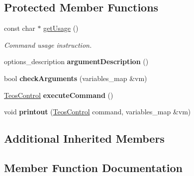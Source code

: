 \subsection*{Protected Member Functions}
\begin{DoxyCompactItemize}
\item 
const char $\ast$ \mbox{\hyperlink{classteos_1_1control_1_1_daemon_start_options_ae036aeede350023308b66b063ba00bd8}{get\+Usage}} ()
\begin{DoxyCompactList}\small\item\em Command \textquotesingle{}usage\textquotesingle{} instruction. \end{DoxyCompactList}\item 
\mbox{\label{classteos_1_1control_1_1_daemon_start_options_ab3960fbf33433037a08ef46e0baeedb7}} 
options\+\_\+description {\bfseries argument\+Description} ()
\item 
\mbox{\label{classteos_1_1control_1_1_daemon_start_options_a51c828308709fb55cfdde2af4443e976}} 
bool {\bfseries check\+Arguments} (variables\+\_\+map \&vm)
\item 
\mbox{\label{classteos_1_1control_1_1_daemon_start_options_ab02fafd8670769f90b749ba60baf6708}} 
\mbox{\hyperlink{classteos_1_1_teos_control}{Teos\+Control}} {\bfseries execute\+Command} ()
\item 
\mbox{\label{classteos_1_1control_1_1_daemon_start_options_a2dda2e522e76c941e540737cf1149151}} 
void {\bfseries printout} (\mbox{\hyperlink{classteos_1_1_teos_control}{Teos\+Control}} command, variables\+\_\+map \&vm)
\end{DoxyCompactItemize}
\subsection*{Additional Inherited Members}


\subsection{Member Function Documentation}
\mbox{\label{classteos_1_1control_1_1_daemon_start_options_ae036aeede350023308b66b063ba00bd8}} 
